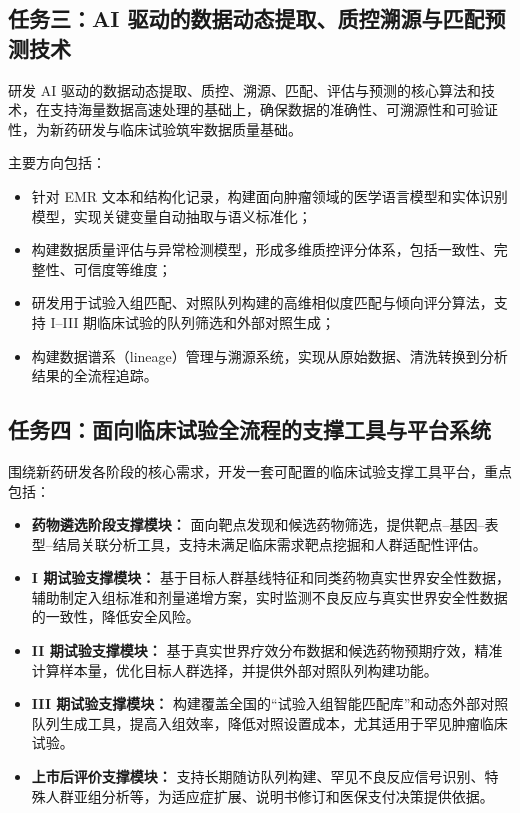 \documentclass[12pt, a4paper, fontset=mac]{ctexart} %
\begin{document}
\subsection*{任务三：AI 驱动的数据动态提取、质控溯源与匹配预测技术}

研发 AI 驱动的数据动态提取、质控、溯源、匹配、评估与预测的核心算法和技术，在支持海量数据高速处理的基础上，确保数据的准确性、可溯源性和可验证性，为新药研发与临床试验筑牢数据质量基础。

\vspace{0.5em}
主要方向包括：

\begin{itemize}
  \item 针对 EMR 文本和结构化记录，构建面向肿瘤领域的医学语言模型和实体识别模型，实现关键变量自动抽取与语义标准化；
  \item 构建数据质量评估与异常检测模型，形成多维质控评分体系，包括一致性、完整性、可信度等维度；
  \item 研发用于试验入组匹配、对照队列构建的高维相似度匹配与倾向评分算法，支持 I--III 期临床试验的队列筛选和外部对照生成；
  \item 构建数据谱系（lineage）管理与溯源系统，实现从原始数据、清洗转换到分析结果的全流程追踪。
\end{itemize}

\subsection*{任务四：面向临床试验全流程的支撑工具与平台系统}

围绕新药研发各阶段的核心需求，开发一套可配置的临床试验支撑工具平台，重点包括：

\begin{itemize}
  \item \textbf{药物遴选阶段支撑模块：} 面向靶点发现和候选药物筛选，提供靶点–基因–表型–结局关联分析工具，支持未满足临床需求靶点挖掘和人群适配性评估。
  \item \textbf{I 期试验支撑模块：} 基于目标人群基线特征和同类药物真实世界安全性数据，辅助制定入组标准和剂量递增方案，实时监测不良反应与真实世界安全性数据的一致性，降低安全风险。
  \item \textbf{II 期试验支撑模块：} 基于真实世界疗效分布数据和候选药物预期疗效，精准计算样本量，优化目标人群选择，并提供外部对照队列构建功能。
  \item \textbf{III 期试验支撑模块：} 构建覆盖全国的“试验入组智能匹配库”和动态外部对照队列生成工具，提高入组效率，降低对照设置成本，尤其适用于罕见肿瘤临床试验。
  \item \textbf{上市后评价支撑模块：} 支持长期随访队列构建、罕见不良反应信号识别、特殊人群亚组分析等，为适应症扩展、说明书修订和医保支付决策提供依据。
\end{itemize}
\end{document}
